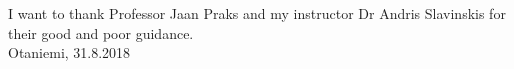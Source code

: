 



\makecoverpage

\makecopyrightpage


  
  

\begin{abstractpage}[english]
	\abstracttext{}
\end{abstractpage}

I want to thank Professor Jaan Praks and my instructor Dr Andris Slavinskis for 
their good and poor guidance.\\

\vspace{5cm}
Otaniemi, 31.8.2018

